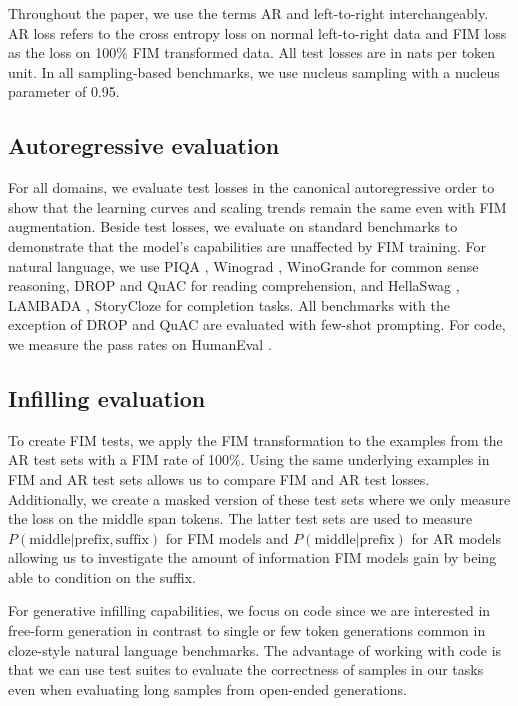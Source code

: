 \documentclass[postscript]{article}
\begin{document}
Throughout the paper, we use the terms AR and left-to-right interchangeably. AR loss refers to the cross entropy loss on normal left-to-right data and FIM loss as the loss on 100\% FIM transformed data. All test losses are in nats per token unit. In all sampling-based benchmarks, we use nucleus sampling \citep{nucleus} with a nucleus parameter of 0.95. 

\subsection{Autoregressive evaluation}
\label{sec:setup:eval:ar}

For all domains, we evaluate test losses in the canonical autoregressive order to show that the learning curves and scaling trends remain the same even with FIM augmentation. Beside test losses,  we evaluate on standard benchmarks to demonstrate that the model's capabilities are unaffected by FIM training. For natural language, we use PIQA \citep{piqa}, Winograd \citep{winograd}, WinoGrande \citep{winogrande} for common sense reasoning, DROP \citep{drop} and QuAC \citep{quac} for reading comprehension, and HellaSwag \citep{hellaswag}, LAMBADA \citep{lambada}, StoryCloze \citep{storycloze} for completion tasks. All benchmarks with the exception of DROP and QuAC
are evaluated with few-shot prompting. For code, we measure the pass rates on HumanEval \citep{codex}.



\subsection{Infilling evaluation}
\label{sec:setup:eval:fim}

To create FIM tests, we apply the FIM transformation to the examples from the AR test sets with a FIM rate of 100\%. Using the same underlying examples in FIM and AR test sets allows us to compare FIM and AR test losses. Additionally, we create a masked version of these test sets where we only measure the loss on the middle span tokens. The latter test sets are used to measure $P(\text{middle}|\text{prefix}, \text{suffix})$ for FIM models and $P(\text{middle}|\text{prefix})$ for AR models allowing us to investigate the amount of information FIM models gain by being able to condition on the suffix.  

For generative infilling capabilities, we focus on code since we are interested in free-form generation in contrast to single or few token generations common in cloze-style natural language benchmarks. The advantage of working with code is that we can use test suites to evaluate the correctness of samples in our tasks even when evaluating long samples from open-ended generations. 
\end{document}
